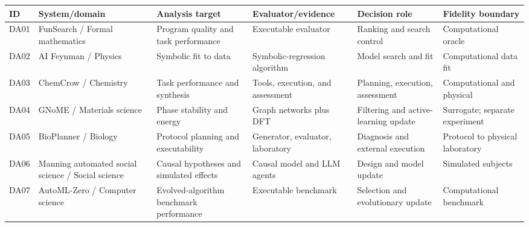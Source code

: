 \begin{tabular}{llp{.18\linewidth}p{.18\linewidth}p{.18\linewidth}p{.16\linewidth}}
\toprule
ID & System/domain & Analysis target & Evaluator/evidence & Decision role & Fidelity boundary \\
\midrule
DA01 & FunSearch / Formal mathematics & Program quality and task performance & Executable evaluator & Ranking and search control & Computational oracle \\
DA02 & AI Feynman / Physics & Symbolic fit to data & Symbolic-regression algorithm & Model search and fit & Computational data fit \\
DA03 & ChemCrow / Chemistry & Task performance and synthesis & Tools, execution, and assessment & Planning, execution, assessment & Computational and physical \\
DA04 & GNoME / Materials science & Phase stability and energy & Graph networks plus DFT & Filtering and active-learning update & Surrogate; separate experiment \\
DA05 & BioPlanner / Biology & Protocol planning and executability & Generator, evaluator, laboratory & Diagnosis and external execution & Protocol to physical laboratory \\
DA06 & Manning automated social science / Social science & Causal hypotheses and simulated effects & Causal model and LLM agents & Design and model update & Simulated subjects \\
DA07 & AutoML-Zero / Computer science & Evolved-algorithm benchmark performance & Executable benchmark & Selection and evolutionary update & Computational benchmark \\
\bottomrule
\end{tabular}
